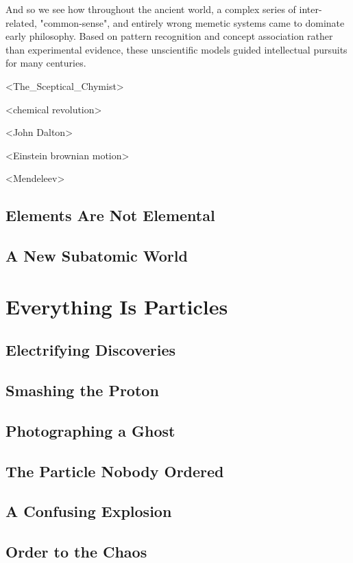 And so we see how throughout the ancient world, a complex series of inter-related, "common-sense", and entirely wrong memetic systems came to dominate early philosophy. Based on pattern recognition and concept association rather than experimental evidence, these unscientific models guided intellectual pursuits for many centuries.

<The_Sceptical_Chymist>

<chemical revolution>

<John Dalton>

<Einstein brownian motion>

<Mendeleev>

\subsection{Elements Are Not Elemental}

\subsection{A New Subatomic World}

\section{Everything Is Particles}

\subsection{Electrifying Discoveries}

\subsection{Smashing the Proton}

\subsection{Photographing a Ghost}

\subsection{The Particle Nobody Ordered}

\subsection{A Confusing Explosion}

\subsection{Order to the Chaos}

